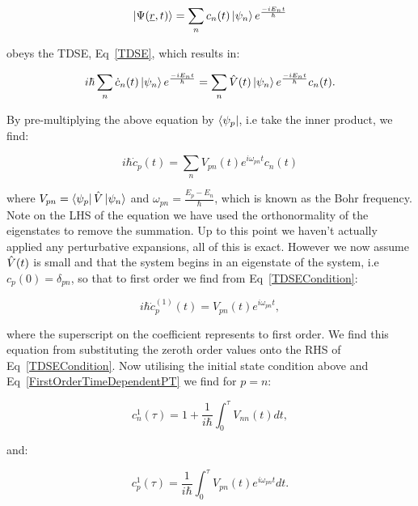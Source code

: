 \begin{equation}
    \ket{\Psi(\underline{r}, t)} = \sum_n c_n(t) \ket{\psi_n} e^\frac{-i E_n t}{\hbar}
    \label{GeneralTimeDependentPerturbationWavefunction}
\end{equation}

\noindent obeys the TDSE, Eq~\ref{TDSE}, which results in:

\begin{equation}
    i \hbar \sum_n \Dot{c}_n(t) \ket{\psi_n} e^\frac{-i E_n t}{\hbar} = \sum_n \Hat{V}(t) \ket{\psi_n} e^\frac{-i E_n t}{\hbar} c_n(t).
\end{equation}

\noindent By pre-multiplying the above equation by $\bra{\psi_p}$, i.e take the inner product, we find:

\begin{equation}
    i \hbar \Dot{c}_p(t) = \sum_n V_{pn}(t) e^{i \omega_{pn} t} c_n(t)
    \label{TDSECondition}
\end{equation}

\noindent where $V_{pn} = \bra{\psi_p} \Hat{V} \ket{\psi_n}$ and $\omega_{pn} = \frac{E_p - E_n}{\hbar}$, which is known as the Bohr frequency. Note on the LHS of the equation we have used the orthonormality of the eigenstates to remove the summation. Up to this point we haven't actually applied any perturbative expansions, all of this is exact. However we now assume $\Hat{V}(t)$ is small and that the system begins in an eigenstate of the system, i.e $c_p(0) = \delta_{pn}$, so that to first order we find from Eq~\ref{TDSECondition}:

\begin{equation}
    i \hbar \Dot{c}^{(1)}_p(t) = V_{pn}(t) e^{i \omega_{pn} t},
    \label{FirstOrderTimeDependentPT}
\end{equation}

\noindent where the superscript on the coefficient represents to first order. We find this equation from substituting the zeroth order values onto the RHS of Eq~\ref{TDSECondition}. Now utilising the initial state condition above and Eq~\ref{FirstOrderTimeDependentPT} we find for $p = n$:

\begin{equation}
    \boxed{c^{1}_n(\tau) = 1 + \frac{1}{i \hbar} \int_0^\tau V_{nn}(t) dt},
    \label{CoefficientN}
\end{equation}

\noindent and:

\begin{equation}
    \boxed{c^{1}_p(\tau) = \frac{1}{i \hbar} \int_0^\tau V_{pn}(t)e^{i\omega_{pn}t} dt}.
    \label{CoefficientP}
\end{equation}

